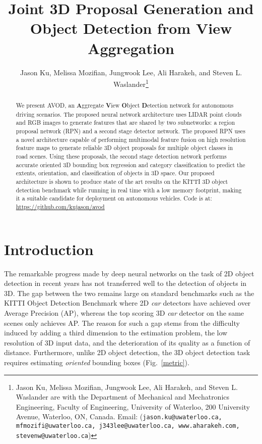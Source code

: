 \documentclass[letterpaper, 10 pt, conference]{ieeeconf}
\title{\LARGE \bf
Joint 3D Proposal Generation and Object Detection from View Aggregation
}
\author{Jason Ku, Melissa Mozifian, Jungwook Lee, Ali Harakeh, and Steven L. Waslander\thanks{Jason Ku, Melissa Mozifian, Jungwook Lee, Ali Harakeh, and Steven L. Waslander are with the Department of Mechanical and Mechatronics Engineering, Faculty of Engineering, University of Waterloo, 200 University Avenue, Waterloo, ON, Canada. Email: ({\tt\small jason.ku@uwaterloo.ca, mfmozifi@uwaterloo.ca, j343lee@uwaterloo.ca, www.aharakeh.com, stevenw@uwaterloo.ca})}}
\newcommand{\fig}[1]{Fig.~\ref{#1}}
\begin{document}
\maketitle
\thispagestyle{empty}
\pagestyle{empty}


\begin{abstract}
We present AVOD, an \textbf{A}ggregate \textbf{V}iew \textbf{O}bject \textbf{D}etection network for autonomous driving scenarios. The proposed neural network architecture uses LIDAR point clouds and RGB images to generate features that are shared by two subnetworks: a region proposal network (RPN) and a second stage detector network. The proposed RPN uses a novel architecture capable of performing multimodal feature fusion on high resolution feature maps to generate reliable 3D object proposals for multiple object classes in road scenes. Using these proposals, the second stage detection network performs accurate oriented 3D bounding box regression and category classification to predict the extents, orientation, and classification of objects in 3D space. Our proposed architecture is shown to produce state of the art results on the KITTI 3D object detection benchmark \cite{geiger2012we} while running in real time with a low memory footprint, making it a suitable candidate for deployment on autonomous vehicles. Code is at: \newline
{\url{https://github.com/kujason/avod}}

\end{abstract}

\section{Introduction}
\label{intro}
The remarkable progress made by deep neural networks on the task of 2D object detection in recent years has not transferred well to the detection of objects in 3D. The gap between the two remains large on standard benchmarks such as the KITTI Object Detection Benchmark \cite{geiger2012we} where 2D \textit{car} detectors have achieved over  Average Precision (AP), whereas the top scoring 3D \textit{car} detector on the same scenes only achieves  AP. The reason for such a gap stems from the difficulty induced by adding a third dimension to the estimation problem, the low resolution of 3D input data, and the deterioration of its quality as a function of distance. Furthermore, unlike 2D object detection, the 3D object detection task requires estimating \textit{oriented} bounding boxes (\fig{metric}).
\end{document}
